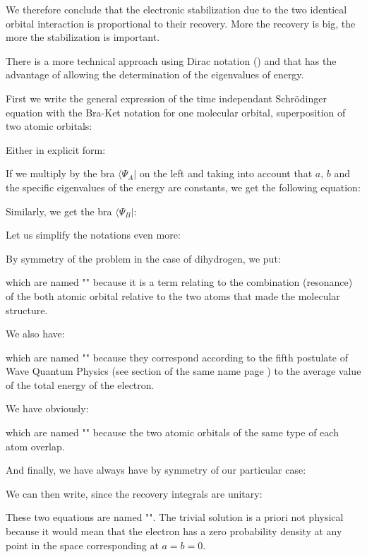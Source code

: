 	We therefore conclude that the electronic stabilization due to the two identical orbital interaction is proportional to their recovery. More the recovery is big, the more the stabilization is important.
	
	There is a more technical approach using Dirac notation () and that has the advantage of allowing the determination of the eigenvalues of energy.

	First we write the general expression of the time independant Schrödinger equation with the Bra-Ket notation for one molecular orbital, superposition of two atomic orbitals:
	
	Either in explicit form:
	
	If we multiply by the bra $\langle \Psi_A|$  on the left and taking into account that $a$, $b$ and the specific eigenvalues of the energy are constants, we get the following equation:
	
	Similarly, we get the bra $\langle \Psi_B|$:
	
	Let us simplify the notations even more:
	
	By symmetry of the problem in the case of dihydrogen, we put:
	
	which are named "" because it is a term relating to the combination (resonance) of the both atomic orbital relative to the two atoms that made the molecular structure.

	We also have:
	
	which are named "" because they correspond according to the fifth postulate of Wave Quantum Physics (see section of the same name page \pageref{fifth postulate of wave quantum physics}) to the average value of the total energy of the electron.

	We have obviously:
	
	which are named "" because the two atomic orbitals of the same type of each atom overlap.
	
	And finally, we have always have by symmetry of our particular case:
	
	We can then write, since the recovery integrals are unitary:
	
	These two equations are named "". The trivial solution is a priori not physical because it would mean that the electron has a zero probability density at any point in the space corresponding at $a=b=0$.

